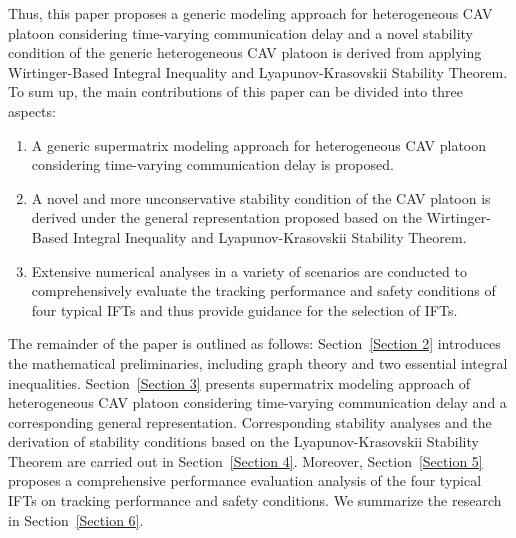 \documentclass[a4paper]{cas-sc}
\begin{document}
Thus, this paper proposes a generic modeling approach for heterogeneous CAV platoon considering time-varying communication delay and a novel stability condition of the generic heterogeneous CAV platoon is derived from applying Wirtinger-Based Integral Inequality and Lyapunov-Krasovskii Stability Theorem. To sum up, the main contributions of this paper can be divided into three aspects:
\begin{enumerate}
  \item A generic supermatrix modeling approach for heterogeneous CAV platoon considering time-varying communication delay is proposed.
  \item A novel and more unconservative stability condition of the CAV platoon is derived under the general representation proposed based on the Wirtinger-Based Integral Inequality and Lyapunov-Krasovskii Stability Theorem.
  \item Extensive numerical analyses in a variety of scenarios are conducted to comprehensively evaluate the tracking performance and safety conditions of four typical IFTs and thus provide guidance for the selection of IFTs.
\end{enumerate}
The remainder of the paper is outlined as follows: Section~\ref{Section 2} introduces the mathematical preliminaries, including graph theory and two essential integral inequalities. Section~\ref{Section 3} presents supermatrix modeling approach of heterogeneous CAV platoon considering time-varying communication delay and a corresponding general representation. Corresponding stability analyses and the derivation of stability conditions based on the Lyapunov-Krasovskii Stability Theorem are carried out in Section~\ref{Section 4}. Moreover, Section~\ref{Section 5} proposes a comprehensive performance evaluation analysis of the four typical IFTs on tracking performance and safety conditions. We summarize the research in Section~\ref{Section 6}.
\end{document}
